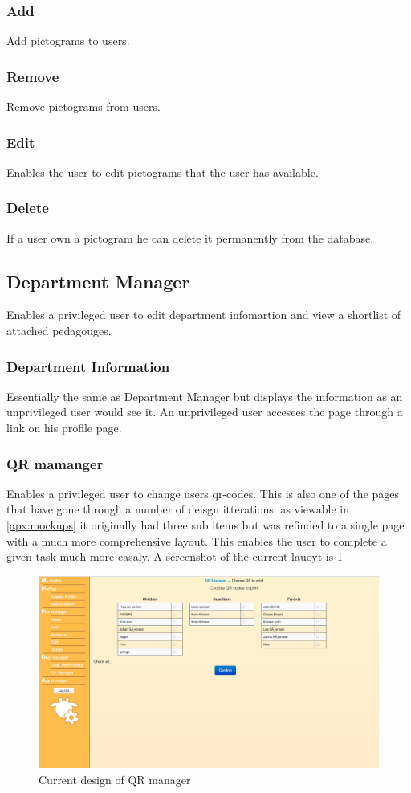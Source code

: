 \subsubsection*{Add}
Add pictograms to users.
\subsubsection*{Remove}
Remove pictograms from users.
\subsubsection*{Edit}
Enables the user to edit pictograms that the user has available.
\subsubsection*{Delete}
If a user own a pictogram he can delete it permanently from the database.

\subsection{Department Manager}
Enables a privileged user to edit department infomartion and view a shortlist of attached pedagouges.
\subsubsection*{Department Information}
Essentially the same as Department Manager but displays the information as an unprivileged user would see it. An unprivileged user accesees the page through a link on his profile page.
\subsubsection*{QR mamanger}
Enables a privileged user to change users qr-codes. This is also one of the pages that have gone through a number of deisgn itterations. as viewable in \ref{apx:mockups} it originally had three sub items but was refinded to a single page with a much more comprehensive layout. This enables the user to complete a given task much more easaly. A screenshot of the current lauoyt is \ref{fig:qrManagerCurrentDesign}
\begin{figure}[p]
\centering
\includegraphics[width=1\textwidth]{images/mockup/qrManagerCurrent.jpg}
\caption{Current design of QR manager}
\label{fig:qrManagerCurrentDesign}
\end{figure}